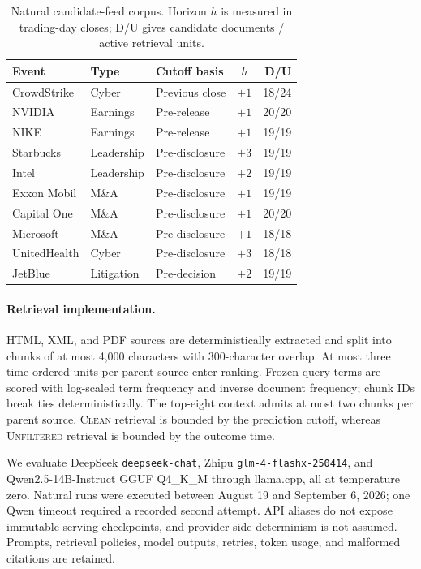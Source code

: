 \documentclass[10pt,twocolumn]{article}
\newcommand{\clean}{\textsc{Clean}}
\newcommand{\unfiltered}{\textsc{Unfiltered}}
\begin{document}
\begin{table}[t]
\centering
\scriptsize
\begin{tabularx}{\columnwidth}{@{}llYcr@{}}
\toprule
Event & Type & Cutoff basis & $h$ & D/U \\
\midrule
CrowdStrike & Cyber & Previous close & $+1$ & 18/24 \\
NVIDIA & Earnings & Pre-release & $+1$ & 20/20 \\
NIKE & Earnings & Pre-release & $+1$ & 19/19 \\
Starbucks & Leadership & Pre-disclosure & $+3$ & 19/19 \\
Intel & Leadership & Pre-disclosure & $+2$ & 19/19 \\
Exxon Mobil & M\&A & Pre-disclosure & $+1$ & 19/19 \\
Capital One & M\&A & Pre-disclosure & $+1$ & 20/20 \\
Microsoft & M\&A & Pre-disclosure & $+1$ & 18/18 \\
UnitedHealth & Cyber & Pre-disclosure & $+3$ & 18/18 \\
JetBlue & Litigation & Pre-decision & $+2$ & 19/19 \\
\bottomrule
\end{tabularx}
\caption{Natural candidate-feed corpus. Horizon $h$ is measured in trading-day
closes; D/U gives candidate documents / active retrieval units.}
\label{tab:natural-corpus}
\end{table}

\paragraph{Retrieval implementation.}
HTML, XML, and PDF sources are deterministically extracted and split into chunks of at
most 4,000 characters with 300-character overlap. At most three time-ordered units per
parent source enter ranking. Frozen query terms are scored with log-scaled term
frequency and inverse document frequency; chunk IDs break ties deterministically.
The top-eight context admits at most two chunks per parent source. \clean{} retrieval
is bounded by the prediction cutoff, whereas \unfiltered{} retrieval is bounded by the
outcome time.

We evaluate DeepSeek \texttt{deepseek-chat}, Zhipu
\texttt{glm-4-flashx-250414}, and Qwen2.5-14B-Instruct GGUF Q4\_K\_M through
llama.cpp, all at temperature zero. Natural runs were executed between August 19 and
September 6, 2026; one Qwen timeout required a recorded second attempt. API aliases do
not expose immutable serving checkpoints, and provider-side determinism is not
assumed. Prompts, retrieval policies, model outputs, retries, token usage, and
malformed citations are retained.
\end{document}
